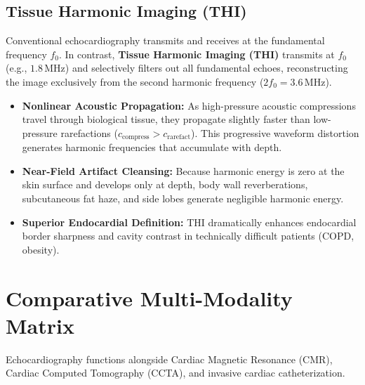 \documentclass[11pt,a4paper]{article}
\begin{document}
\subsection{Tissue Harmonic Imaging (THI)}

Conventional echocardiography transmits and receives at the fundamental frequency $f_0$. In contrast, \textbf{Tissue Harmonic Imaging (THI)} transmits at $f_0$ (e.g., $1.8\,\text{MHz}$) and selectively filters out all fundamental echoes, reconstructing the image exclusively from the second harmonic frequency ($2 f_0 = 3.6\,\text{MHz}$).
\begin{itemize}[leftmargin=*]
    \item \textbf{Nonlinear Acoustic Propagation:} As high-pressure acoustic compressions travel through biological tissue, they propagate slightly faster than low-pressure rarefactions ($c_{\text{compress}} > c_{\text{rarefact}}$). This progressive waveform distortion generates harmonic frequencies that accumulate with depth.
    \item \textbf{Near-Field Artifact Cleansing:} Because harmonic energy is zero at the skin surface and develops only at depth, body wall reverberations, subcutaneous fat haze, and side lobes generate negligible harmonic energy.
    \item \textbf{Superior Endocardial Definition:} THI dramatically enhances endocardial border sharpness and cavity contrast in technically difficult patients (COPD, obesity).
\end{itemize}

\newpage
\section{Comparative Multi-Modality Matrix}

Echocardiography functions alongside Cardiac Magnetic Resonance (CMR), Cardiac Computed Tomography (CCTA), and invasive cardiac catheterization.
\end{document}
